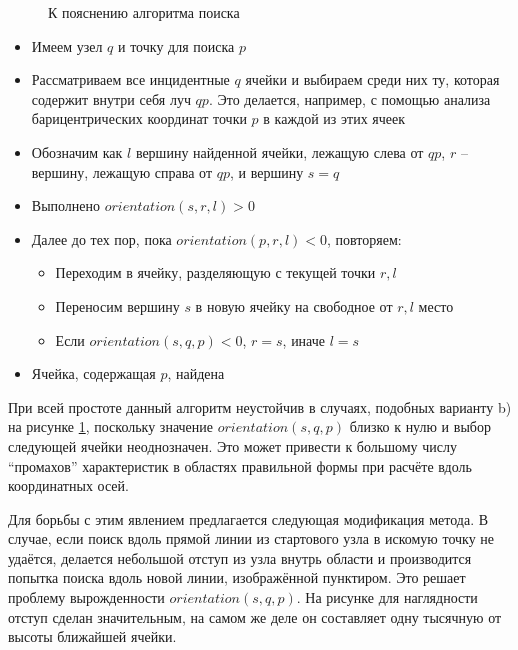 \begin{figure}[H]
	\caption{К пояснению алгоритма поиска}
	\label{pic:line-walk}
\end{figure}

\begin{itemize}
\item Имеем узел $q$ и точку для поиска $p$
\item Рассматриваем все инцидентные $q$ ячейки и выбираем среди них ту, 
которая содержит внутри себя луч $qp$. Это делается, например, 
с помощью анализа барицентрических координат точки $p$ в каждой из этих ячеек
\item Обозначим как $l$ вершину найденной ячейки, лежащую слева от $qp$, 
$r$ -- вершину, лежащую справа от $qp$, и вершину $s = q$
\item Выполнено $orientation(s, r, l) > 0$
\item Далее до тех пор, пока $orientation(p, r, l) < 0$, повторяем:
	\begin{itemize}
		\item Переходим в ячейку, разделяющую с текущей точки $r, l$
		\item Переносим вершину $s$ в новую ячейку на свободное от $r, l$ место
		\item Если $orientation(s, q, p) < 0$, $r = s$, иначе $l = s$
	\end{itemize}
\item Ячейка, содержащая $p$, найдена
\end{itemize}

При всей простоте данный алгоритм неустойчив в случаях, 
подобных варианту b) на рисунке \ref{pic:line-walk}, 
поскольку значение $orientation(s, q, p)$ близко к нулю и выбор 
следующей ячейки неоднозначен. Это может привести к большому числу 
``промахов'' характеристик в областях правильной формы при 
расчёте вдоль координатных осей. 

Для борьбы с этим явлением предлагается следующая модификация метода. 
В случае, если поиск вдоль прямой линии из стартового узла в искомую точку не удаётся, 
делается небольшой отступ из узла внутрь области и производится попытка поиска 
вдоль новой линии, изображённой пунктиром. 
Это решает проблему вырожденности $orientation(s, q, p)$. 
На рисунке для наглядности отступ сделан значительным, на самом же деле 
он составляет одну тысячную от высоты ближайшей ячейки.



